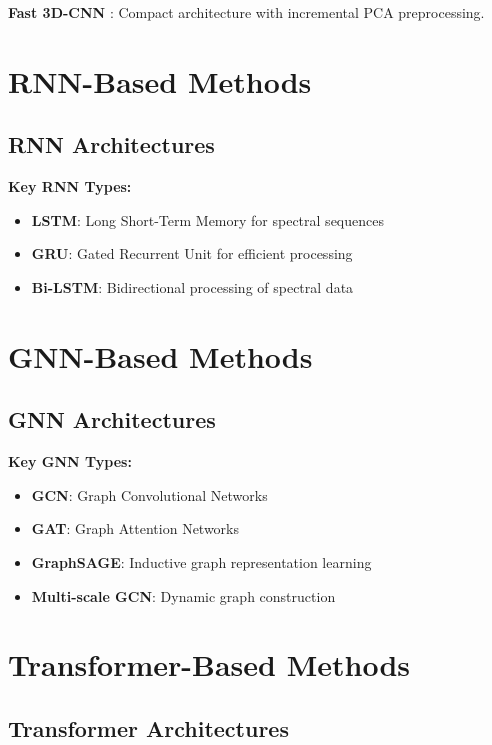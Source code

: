 \documentclass[12pt,a4paper]{article}
\begin{document}
\textbf{Fast 3D-CNN} \cite{ahmad2021fast}: Compact architecture with incremental PCA preprocessing.

\section{RNN-Based Methods}

\subsection{RNN Architectures}

\textbf{Key RNN Types:}
\begin{itemize}
\item \textbf{LSTM}: Long Short-Term Memory for spectral sequences \cite{mou2017deep}
\item \textbf{GRU}: Gated Recurrent Unit for efficient processing
\item \textbf{Bi-LSTM}: Bidirectional processing of spectral data
\end{itemize}

\section{GNN-Based Methods}

\subsection{GNN Architectures}

\textbf{Key GNN Types:}
\begin{itemize}
\item \textbf{GCN}: Graph Convolutional Networks \cite{hong2020graph}
\item \textbf{GAT}: Graph Attention Networks
\item \textbf{GraphSAGE}: Inductive graph representation learning
\item \textbf{Multi-scale GCN}: Dynamic graph construction \cite{wan2019multiscale}
\end{itemize}

\section{Transformer-Based Methods}

\subsection{Transformer Architectures}
\end{document}
